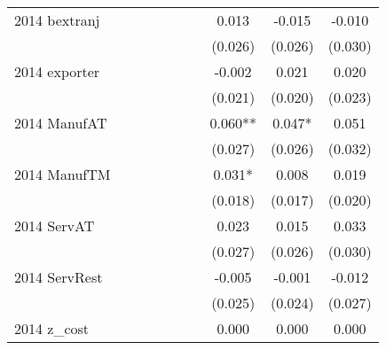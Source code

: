 \begin{table}[htbp]
\begin{tabular}{l*{9}{c}}
2014 bextranj       &               &               &               &               &               &               &       0.013   &      -0.015   &      -0.010   \\
                    &               &               &               &               &               &               &     (0.026)   &     (0.026)   &     (0.030)   \\
2014 exporter       &               &               &               &               &               &               &      -0.002   &       0.021   &       0.020   \\
                    &               &               &               &               &               &               &     (0.021)   &     (0.020)   &     (0.023)   \\
2014 ManufAT        &               &               &               &               &               &               &       0.060** &       0.047*  &       0.051   \\
                    &               &               &               &               &               &               &     (0.027)   &     (0.026)   &     (0.032)   \\
2014 ManufTM        &               &               &               &               &               &               &       0.031*  &       0.008   &       0.019   \\
                    &               &               &               &               &               &               &     (0.018)   &     (0.017)   &     (0.020)   \\
2014 ServAT         &               &               &               &               &               &               &       0.023   &       0.015   &       0.033   \\
                    &               &               &               &               &               &               &     (0.027)   &     (0.026)   &     (0.030)   \\
2014 ServRest       &               &               &               &               &               &               &      -0.005   &      -0.001   &      -0.012   \\
                    &               &               &               &               &               &               &     (0.025)   &     (0.024)   &     (0.027)   \\
2014 z\_cost         &               &               &               &               &               &               &       0.000   &       0.000   &       0.000   \\

\end{tabular}
\end{table}
